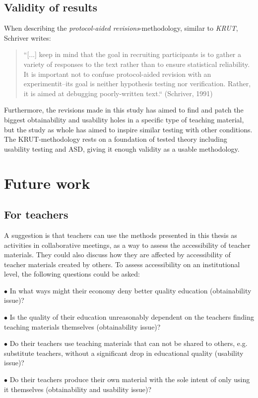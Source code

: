 \subsection{Validity of results}
When describing the \textit{protocol-aided revisions}-methodology, similar to \textit{KRUT}, Schriver writes:
\begin{quote}
“[...] keep in mind that the goal in recruiting participants is to gather a variety of responses to the text rather than to ensure statistical reliability. It is important not to confuse protocol-aided revision with an experimentit--its goal is neither hypothesis testing nor verification. Rather, it is aimed at debugging poorly-written text.“ (Schriver, 1991)
\end{quote}
Furthermore, the revisions made in this study has aimed to find and patch the biggest obtainability and usability holes in a specific type of teaching material, but the study as whole has aimed to inspire similar testing with other conditions.
The KRUT-methodology rests on a foundation of tested theory including usability testing and ASD, giving it enough validity as a usable methodology.

\section{Future work}
\subsection{For teachers}
A suggestion is that teachers can use the methods presented in this thesis as activities in collaborative meetings, as a way to assess the accessibility of teacher materials. They could also discuss how they are affected by accessibility of teacher materials created by others. To assess accessibility on an institutional level, the following questions could be asked:
\begin{description}
\item $\bullet$ In what ways might their economy deny better quality education (obtainability issue)? 
\item $\bullet$ Is the quality of their education unreasonably dependent on the teachers finding teaching materials themselves (obtainability issue)? 
\item $\bullet$ Do their teachers use teaching materials that can not be shared to others, e.g. substitute teachers, without a significant drop in educational quality (usability issue)?
\item $\bullet$ Do their teachers produce their own material with the sole intent of only using it themselves (obtainability and usability issue)?
\end{description}
